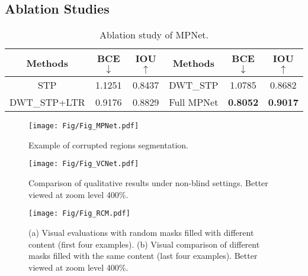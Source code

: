 \subsection{Ablation Studies}
\label{Ablation Studies}
\begin{table}[tb]
\footnotesize
\renewcommand\tabcolsep{3.5pt}
  \centering
  \caption{Ablation study of MPNet.}
  \vspace{-0.2cm}
    \begin{tabular}{c|cc||c|cc}
    \hline
    \hline
     \rowcolor{mygray} \textbf{Methods} &BCE$\downarrow$ & IOU$\uparrow$   & \textbf{Methods} &BCE$\downarrow$ & IOU$\uparrow$  \\
    \hline
    \hline
    STP &1.1251       &0.8437      & DWT\_STP &1.0785  &0.8682  \\
    DWT\_STP+LTR &0.9176    &0.8829       & Full MPNet &\textbf{0.8052}       &\textbf{0.9017}  \\
    \hline
    \hline
    \end{tabular}%
  \label{tab_M}%
  \vspace{-0.3cm}
\end{table}%
\begin{figure}[tb]
\centering%
\texttt{[image: Fig/Fig\_MPNet.pdf]}
 \vspace{-0.6cm}
\caption{Example of corrupted regions segmentation.}
\label{Fig_MV}
\vspace{-0.1cm}
\end{figure}
\begin{figure}[!t]
\centering%
\texttt{[image: Fig/Fig\_VCNet.pdf]}
\vspace{-0.7cm}
\caption{Comparison of qualitative results under non-blind settings. Better viewed at zoom level 400\%.}
\vspace{-0.2cm}
\label{Fig_VQ}
\end{figure}

\begin{figure*}[!t]
\centering%
\texttt{[image: Fig/Fig\_RCM.pdf]}
\vspace{-0.5cm}
\caption{(a) Visual evaluations with random masks filled with different content (first four examples). (b) Visual comparison of different masks filled with the same content (last four examples). Better viewed at zoom level 400\%.}
\label{Fig_RCM}
\vspace{-0.2cm}
\end{figure*}



